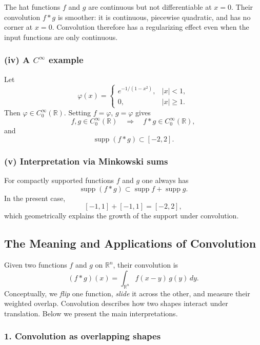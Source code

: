 \documentclass[12pt,a4paper]{article}
\theoremstyle{plain}
\theoremstyle{definition}
\theoremstyle{remark}
\theoremstyle{remark}
\begin{document}
The hat functions $f$ and $g$ are continuous but not differentiable at
$x=0$. Their convolution $f*g$ is smoother: it is continuous, piecewise
quadratic, and has no corner at $x=0$.  Convolution therefore has a
regularizing effect even when the input functions are only continuous.

\bigskip

\subsubsection*{(iv) A $C^\infty$ example}

Let
\[
\varphi(x)=
\begin{cases}
	e^{-1/(1-x^2)}, & |x|<1,\\[1ex]
	0, & |x|\ge 1.
\end{cases}
\]
Then $\varphi\in C_0^\infty(\mathbb{R})$.  Setting $f=\varphi$, $g=\varphi$
gives
\[
f,g \in C_0^\infty(\mathbb{R})
\quad\Longrightarrow\quad
f*g\in C_0^\infty(\mathbb{R}),
\]
and
\[
\operatorname{supp}(f*g)\subset [-2,2].
\]

\bigskip

\subsubsection*{(v) Interpretation via Minkowski sums}

For compactly supported functions $f$ and $g$ one always has
\[
\operatorname{supp}(f*g)
\subset \operatorname{supp}f + \operatorname{supp}g.
\]
In the present case,
\[
[-1,1] + [-1,1] = [-2,2],
\]
which geometrically explains the growth of the support under convolution.


\subsection*{The Meaning and Applications of Convolution}

Given two functions $f$ and $g$ on $\mathbb{R}^n$, their convolution is
\[
(f*g)(x)
= \int_{\mathbb{R}^n} f(x-y)\,g(y)\,dy.
\]
Conceptually, we \emph{flip} one function, \emph{slide} it across the other,
and measure their weighted overlap. Convolution describes how two shapes
interact under translation. Below we present the main interpretations.

\subsubsection*{1. Convolution as overlapping shapes}
\end{document}
